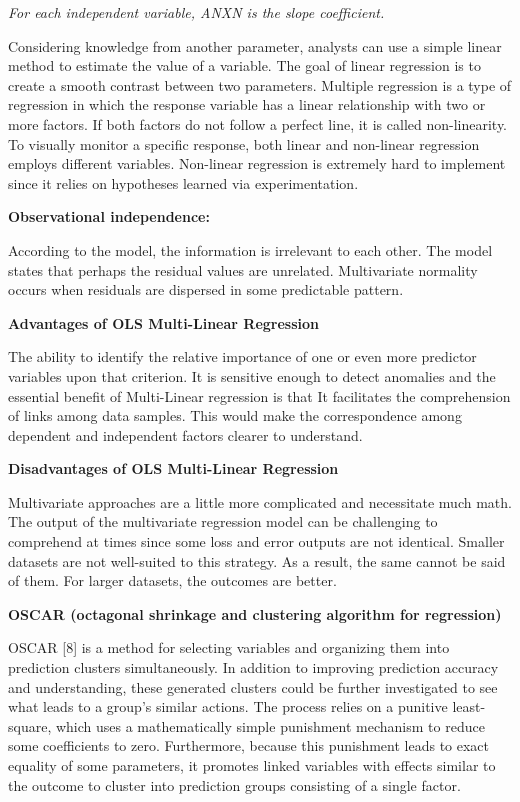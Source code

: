 \documentclass{article} %
\begin{document}
\noindent \textit{For each independent variable, ANXN is the slope coefficient.}

\noindent Considering knowledge from another parameter, analysts can use a simple linear method to estimate the value of a variable. The goal of linear regression is to create a smooth contrast between two parameters. Multiple regression is a type of regression in which the response variable has a linear relationship with two or more factors. If both factors do not follow a perfect line, it is called non-linearity. To visually monitor a specific response, both linear and non-linear regression employs different variables. Non-linear regression is extremely hard to implement since it relies on hypotheses learned via experimentation.

\noindent \textbf{Observational independence:}

\noindent According to the model, the information is irrelevant to each other. The model states that perhaps the residual values are unrelated. Multivariate normality occurs when residuals are dispersed in some predictable pattern.

\noindent \textbf{Advantages of OLS Multi-Linear Regression}

\noindent The ability to identify the relative importance of one or even more predictor variables upon that criterion. It is sensitive enough to detect anomalies and the essential benefit of Multi-Linear regression is that It facilitates the comprehension of links among data samples. This would make the correspondence among dependent and independent factors clearer to understand.

\noindent \textbf{Disadvantages of OLS Multi-Linear Regression}

\noindent Multivariate approaches are a little more complicated and necessitate much math. The output of the multivariate regression model can be challenging to comprehend at times since some loss and error outputs are not identical. Smaller datasets are not well-suited to this strategy. As a result, the same cannot be said of them. For larger datasets, the outcomes are better.

\noindent 

\noindent \textbf{OSCAR (octagonal shrinkage and clustering algorithm for regression)}

\noindent OSCAR [8] is a method for selecting variables and organizing them into prediction clusters simultaneously. In addition to improving prediction accuracy and understanding, these generated clusters could be further investigated to see what leads to a group's similar actions. The process relies on a punitive least-square, which uses a mathematically simple punishment mechanism to reduce some coefficients to zero. Furthermore, because this punishment leads to exact equality of some parameters, it promotes linked variables with effects similar to the outcome to cluster into prediction groups consisting of a single factor.
\end{document}
